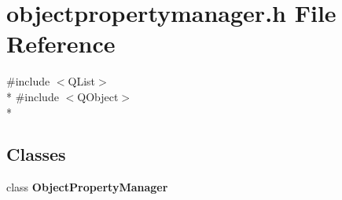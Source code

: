 \section{objectpropertymanager.\+h File Reference}
\label{objectpropertymanager_8h}
{\ttfamily \#include $<$Q\+List$>$}\\*
{\ttfamily \#include $<$Q\+Object$>$}\\*
\subsection*{Classes}
\begin{DoxyCompactItemize}
\item 
class {\bf Object\+Property\+Manager}
\end{DoxyCompactItemize}
